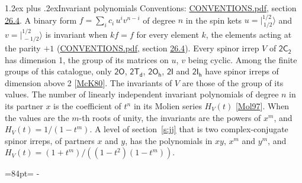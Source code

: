 \documentclass[10pt,a4paper]{article}
\makeatletter
\renewcommand\section{\@startsection{section}{1}{\z@}{-3ex plus -1ex minus -.2ex}%
  {1.2ex plus .2ex}{\normalfont\large\sffamily\bfseries\color{parttitle}}}
\newcommand{\needspace}[1]{\par\penalty-100\begingroup\dimen0=#1\relax\dimen2=\pagegoal
  \advance\dimen2-\pagetotal\ifdim\dimen0>\dimen2\relax\ifdim\dimen2>0pt\vfil\break\fi\fi
  \endgroup}
\numberwithin{equation}{section}
\newcommand{\grp}[1]{\mathsf{#1}}
\newcommand{\jm}[2]{\bigl\lvert{}^{#1}_{\,#2}\bigr\rangle}
\makeatother
\begin{document}
\section{Invariant polynomials}\label{s:invariants}
Conventions: \href{../../CONVENTIONS.pdf}{CONVENTIONS.pdf}, section \href{../../CONVENTIONS.pdf\#conv.26.4}{26.4}.
\leavevmode\label{n:local.binary.form}A binary form $f = \sum_i c_i\, u^i v^{n-i}$ of degree $n$ in the spin kets $u = \jm{1/2}{1/2}$ and $v = \jm{1/2}{-1/2}$ is invariant when $k f = f$ for every element $k$, the elements acting at the parity $+1$ (\href{../../CONVENTIONS.pdf}{CONVENTIONS.pdf}, section \href{../../CONVENTIONS.pdf\#conv.26.4}{26.4}).
\leavevmode\label{n:function.hilbert}Every spinor irrep $V$ of $\grp{2C_{2}}$ has dimension 1, the group of its matrices on $u$, $v$ being cyclic. Among the finite groups of this catalogue, only $\grp{2O}$, $\grp{2T_{d}}$, $\grp{2O_{h}}$, $\grp{2I}$ and $\grp{2I_{h}}$ have spinor irreps of dimension above 2 [\href{../../../REFERENCES.pdf\#ref.McK80}{McK80}]. The invariants of $V$ are those of the group of its values. \label{n:local.partner.x}The number of linearly independent invariant polynomials of degree $n$ in its partner $x$ is the coefficient of $t^n$ in its Molien series $H_V(t)$ [\href{../../../REFERENCES.pdf\#ref.Mol97}{Mol97}]. When the values are the $m$-th roots of unity, the invariants are the powers of $x^{m}$, and $H_V(t) = 1/(1 - t^{m})$. A level of section~\ref{s:jj} that is two complex-conjugate spinor irreps, of partners $x$ and $y$, has the polynomials in $xy$, $x^{m}$ and $y^{m}$, and $H_V(t) = (1 + t^{m})/((1 - t^{2})(1 - t^{m}))$.
\needspace{84pt}
\end{document}
